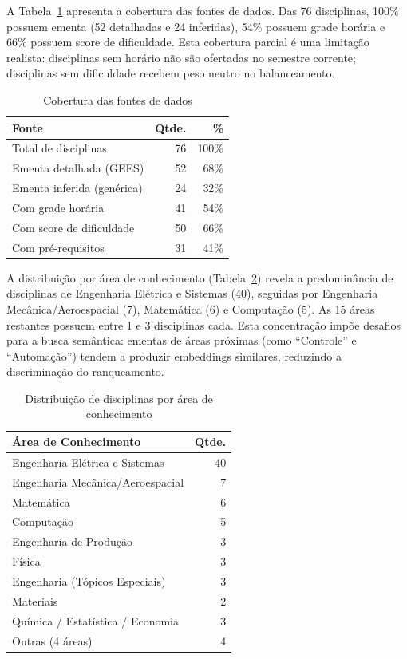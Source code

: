 \documentclass[12pt,a4paper]{article}
\begin{document}
A Tabela~\ref{tab:coverage} apresenta a cobertura das fontes de dados. Das 76 disciplinas, 100\% possuem ementa (52 detalhadas e 24 inferidas), 54\% possuem grade horária e 66\% possuem score de dificuldade. Esta cobertura parcial é uma limitação realista: disciplinas sem horário não são ofertadas no semestre corrente; disciplinas sem dificuldade recebem peso neutro no balanceamento.

\begin{table}[H]
\centering
\caption{Cobertura das fontes de dados}
\label{tab:coverage}
\begin{tabular}{lrr}
\toprule
\textbf{Fonte} & \textbf{Qtde.} & \textbf{\%} \\
\midrule
Total de disciplinas       & 76 & 100\% \\
Ementa detalhada (GEES)    & 52 & 68\%  \\
Ementa inferida (genérica) & 24 & 32\%  \\
Com grade horária          & 41 & 54\%  \\
Com score de dificuldade   & 50 & 66\%  \\
Com pré-requisitos         & 31 & 41\%  \\
\bottomrule
\end{tabular}
\end{table}

A distribuição por área de conhecimento (Tabela~\ref{tab:areas}) revela a predominância de disciplinas de Engenharia Elétrica e Sistemas (40), seguidas por Engenharia Mecânica/Aeroespacial (7), Matemática (6) e Computação (5). As 15 áreas restantes possuem entre 1 e 3 disciplinas cada. Esta concentração impõe desafios para a busca semântica: ementas de áreas próximas (como ``Controle'' e ``Automação'') tendem a produzir embeddings similares, reduzindo a discriminação do ranqueamento.

\begin{table}[H]
\centering
\caption{Distribuição de disciplinas por área de conhecimento}
\label{tab:areas}
\begin{tabular}{lr}
\toprule
\textbf{Área de Conhecimento} & \textbf{Qtde.} \\
\midrule
Engenharia Elétrica e Sistemas    & 40 \\
Engenharia Mecânica/Aeroespacial  & 7  \\
Matemática                        & 6  \\
Computação                        & 5  \\
Engenharia de Produção            & 3  \\
Física                            & 3  \\
Engenharia (Tópicos Especiais)    & 3  \\
Materiais                         & 2  \\
Química / Estatística / Economia  & 3  \\
Outras (4 áreas)                  & 4  \\
\bottomrule
\end{tabular}
\end{table}
\end{document}
